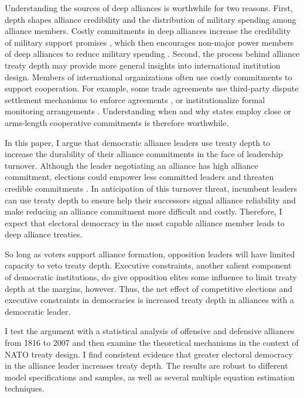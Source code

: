 \documentclass[12pt]{article}
\begin{document}
Understanding the sources of deep alliances is worthwhile for two reasons.
First, depth shapes alliance credibility and the distribution of military spending among alliance members. 
Costly commitments in deep alliances increase the credibility of military support promises \citep{Morrow1994}, which then encourages non-major power members of deep alliances to reduce military spending \citep{Alley2020}.  
Second, the process behind alliance treaty depth may provide more general insights into international institution design. 
Members of international organizations often use costly commitments to support cooperation. 
For example, some trade agreements use third-party dispute settlement mechanisms to enforce agreements \citep{Smith2000}, or institutionalize formal monitoring arrangements \citep{Duretal2013}.  
Understanding when and why states employ close or arms-length cooperative commitments is therefore worthwhile. 


In this paper, I argue that democratic alliance leaders use treaty depth to increase the durability of their alliance commitments in the face of leadership turnover. 
Although the leader negotiating an alliance has high alliance commitment, elections could empower less committed leaders and threaten credible commitments \citep{GartzkeGleditsch2004, LeedsSavun2007}.
In anticipation of this turnover threat, incumbent leaders can use treaty depth to ensure help their successors signal alliance reliability and make reducing an alliance commitment more difficult and costly. 
Therefore, I expect that electoral democracy in the most capable alliance member leads to deep alliance treaties. 


So long as voters support alliance formation, opposition leaders will have limited capacity to veto treaty depth. 
Executive constraints, another salient component of democratic institutions, do give opposition elites some influence to limit treaty depth at the margins, however.
Thus, the net effect of competitive elections and executive constraints in democracies is increased treaty depth in alliances with a democratic leader.  


I test the argument with a statistical analysis of offensive and defensive alliances from 1816 to 2007 and then examine the theoretical mechanisms in the context of NATO treaty design.
I find consistent evidence that greater electoral democracy in the alliance leader increases treaty depth. 
The results are robust to different model specifications and samples, as well as several multiple equation estimation techniques. 
\end{document}
